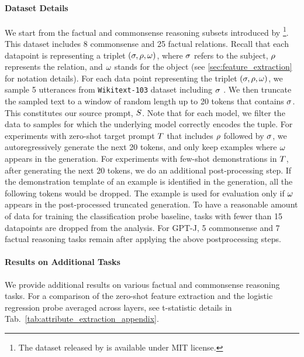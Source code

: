 \documentclass{article}
\theoremstyle{plain}
\theoremstyle{definition}
\theoremstyle{remark}
\begin{document}
\paragraph{Dataset Details} We start from the factual and commonsense reasoning subsets introduced by \citet{hernandez2023linearity}\footnote{The dataset released by \citet{hernandez2023linearity} is available under MIT license.}. This dataset includes 8 commonsense and 25 factual relations. Recall that each datapoint is representing a triplet $(\sigma, \rho, \omega)$, where $\sigma$ refers to the subject, $\rho$ represents the relation, and $\omega$ stands for the object (see \ref{sec:feature_extraction} for notation details). For each data point representing the triplet $(\sigma, \rho, \omega)$, we sample 5 utterances from \texttt{Wikitext-103} dataset \cite{merity2016pointer} including $\sigma$ . We then truncate the sampled text to a window of random length up to 20 tokens that contains $\sigma$. This constitutes our source prompt, $S$. Note that for each model, we filter the data to samples for which the underlying model correctly encodes the tuple. For experiments with zero-shot target prompt $T$ that includes $\rho$ followed by $\sigma$, we autoregressively generate the next 20 tokens, and only keep examples where $\omega$ appears in the generation. For experiments with few-shot demonstrations in $T$, after generating the next 20 tokens, we do an additional post-processing step. If the demonstration template of an example is identified in the generation, all the following tokens would be dropped. The example is used for evaluation only if $\omega$ appears in the post-processed truncated generation. To have a reasonable amount of data for training the classification probe baseline, tasks with fewer than 15 datapoints are dropped from the analysis. For GPT-J, 5 commonsense and 7 factual reasoning tasks remain after applying the above postprocessing steps.

\paragraph{Results on Additional Tasks} We provide additional results on various factual and commonsense reasoning tasks. For a comparison of the zero-shot feature extraction \methodName{} and the logistic regression probe averaged across layers, see t-statistic details in Tab.~\ref{tab:attribute_extraction_appendix}. 
\end{document}
